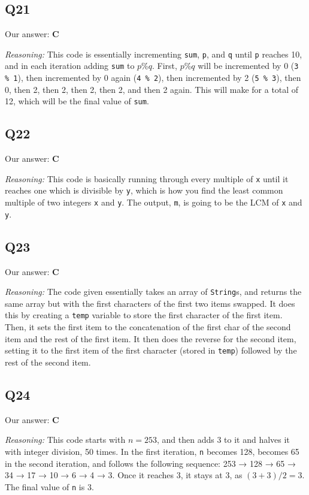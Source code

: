 \documentclass{article}
\begin{document}
\subsection{Q21}

Our answer: \textbf{C}

\noindent\textit{Reasoning:} This code is essentially incrementing \verb|sum|, \verb|p|, and \verb|q| until \verb|p| reaches 10, and in each iteration adding \verb|sum| to \(p \% q\). First, \(p \% q\) will be incremented by 0 (\verb|3 % 1|), then incremented by 0 again (\verb|4 % 2|), then incremented by 2 (\verb|5 % 3|), then 0, then 2, then 2, then 2, then 2, and then 2 again. This will make for a total of 12, which will be the final value of \verb|sum|.

\subsection{Q22}

Our answer: \textbf{C}

\noindent\textit{Reasoning:} This code is basically running through every multiple of \verb|x| until it reaches one which is divisible by \verb|y|, which is how you find the least common multiple of two integers \verb|x| and \verb|y|. The output, \verb|m|, is going to be the LCM of \verb|x| and \verb|y|.

\subsection{Q23}

Our answer: \textbf{C}

\noindent\textit{Reasoning:} The code given essentially takes an array of \verb|String|s, and returns the same array but with the first characters of the first two items swapped. It does this by creating a \verb|temp| variable to store the first character of the first item. Then, it sets the first item to the concatenation of the first char of the second item and the rest of the first item. It then does the reverse for the second item, setting it to the first item of the first character (stored in \verb|temp|) followed by the rest of the second item.

\subsection{Q24}

Our answer: \textbf{C}

\noindent\textit{Reasoning:} This code starts with \(n = 253\), and then adds 3 to it and halves it with integer division, 50 times. In the first iteration, \verb|n| becomes 128, becomes 65 in the second iteration, and follows the following sequence: 253 → 128 → 65 → 34 → 17 → 10 → 6 → 4 → 3. Once it reaches 3, it stays at 3, as \((3 + 3) / 2 = 3\). The final value of \verb|n| is 3.
\end{document}
